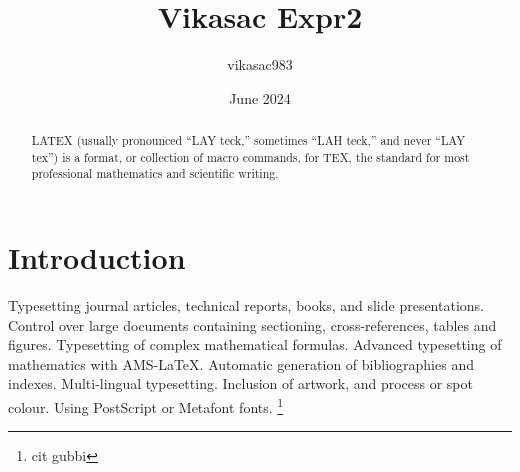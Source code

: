\documentclass[a5paper,90pt]{article}
\title{Vikasac Expr2}
\author{vikasac983 }
\date{June 2024}
\begin{document}
\begin{abstract}
    LATEX (usually pronounced “LAY teck,” sometimes “LAH teck,” and never “LAY tex”) is a format, or collection of macro commands, for TEX, the standard for most professional mathematics and scientific writing.
\end{abstract}
\maketitle

\section{Introduction}

Typesetting journal articles, technical reports, books, and slide presentations.
Control over large documents containing sectioning, cross-references, tables and figures.
Typesetting of complex mathematical formulas.
Advanced typesetting of mathematics with AMS-LaTeX.
Automatic generation of bibliographies and indexes.
Multi-lingual typesetting.
Inclusion of artwork, and process or spot colour.
Using PostScript or Metafont fonts.
\footnote{cit gubbi}
\end{document}
